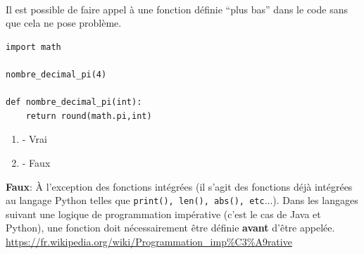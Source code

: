 \begin{Exercice}[2 minutes]\\
Il est possible de faire appel à une fonction définie ``plus bas'' dans le code sans que cela ne pose problème.

\begin{lstlisting}
import math

nombre_decimal_pi(4)

def nombre_decimal_pi(int):
    return round(math.pi,int)
\end{lstlisting}

\begin{enumerate}[label=\Alph*]
    \item - Vrai
    \item - Faux
\end{enumerate}
\begin{solution}
    \textbf{Faux}: À l'exception des fonctions intégrées (il s'agit des fonctions déjà intégrées au langage Python telles que \lstinline{print(), len(), abs(), etc}...). Dans les langages suivant une logique de programmation impérative (c'est le cas de Java et Python), une fonction doit nécessairement être définie \textbf{avant} d'être appelée.
    \url{https://fr.wikipedia.org/wiki/Programmation\_imp\%C3\%A9rative}
\end{solution}
\end{Exercice}


